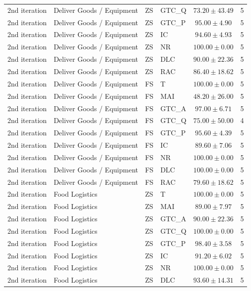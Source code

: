 \begin{longtable}{llllcr}
2nd iteration & Deliver Goods / Equipment & ZS & GTC_Q & $73.20 \pm 43.49$ & 5 \\
2nd iteration & Deliver Goods / Equipment & ZS & GTC_P & $95.00 \pm 4.90$ & 5 \\
2nd iteration & Deliver Goods / Equipment & ZS & IC & $94.60 \pm 4.93$ & 5 \\
2nd iteration & Deliver Goods / Equipment & ZS & NR & $100.00 \pm 0.00$ & 5 \\
2nd iteration & Deliver Goods / Equipment & ZS & DLC & $90.00 \pm 22.36$ & 5 \\
2nd iteration & Deliver Goods / Equipment & ZS & RAC & $86.40 \pm 18.62$ & 5 \\
2nd iteration & Deliver Goods / Equipment & FS & T & $100.00 \pm 0.00$ & 5 \\
2nd iteration & Deliver Goods / Equipment & FS & MAI & $48.20 \pm 26.00$ & 5 \\
2nd iteration & Deliver Goods / Equipment & FS & GTC_A & $97.00 \pm 6.71$ & 5 \\
2nd iteration & Deliver Goods / Equipment & FS & GTC_Q & $75.00 \pm 50.00$ & 4 \\
2nd iteration & Deliver Goods / Equipment & FS & GTC_P & $95.60 \pm 4.39$ & 5 \\
2nd iteration & Deliver Goods / Equipment & FS & IC & $89.60 \pm 7.06$ & 5 \\
2nd iteration & Deliver Goods / Equipment & FS & NR & $100.00 \pm 0.00$ & 5 \\
2nd iteration & Deliver Goods / Equipment & FS & DLC & $100.00 \pm 0.00$ & 5 \\
2nd iteration & Deliver Goods / Equipment & FS & RAC & $79.60 \pm 18.62$ & 5 \\
2nd iteration & Food Logistics & ZS & T & $100.00 \pm 0.00$ & 5 \\
2nd iteration & Food Logistics & ZS & MAI & $89.00 \pm 7.97$ & 5 \\
2nd iteration & Food Logistics & ZS & GTC_A & $90.00 \pm 22.36$ & 5 \\
2nd iteration & Food Logistics & ZS & GTC_Q & $100.00 \pm 0.00$ & 5 \\
2nd iteration & Food Logistics & ZS & GTC_P & $98.40 \pm 3.58$ & 5 \\
2nd iteration & Food Logistics & ZS & IC & $91.20 \pm 6.02$ & 5 \\
2nd iteration & Food Logistics & ZS & NR & $100.00 \pm 0.00$ & 5 \\
2nd iteration & Food Logistics & ZS & DLC & $93.60 \pm 14.31$ & 5 \\

\end{longtable}
